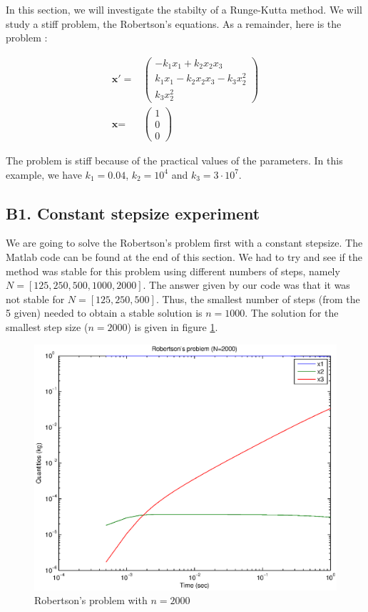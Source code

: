 In this section, we will investigate the stabilty of a Runge-Kutta method. We will study a stiff problem, the Robertson's equations. As a remainder, here is the problem : 

\begin{eqnarray*}
\textbf{x}' =& \left( \begin{array}{c}
-k_1x_1+k_2x_2x_3 \\ 
k_1x_1-k_2x_2x_3-k_3x_2^2 \\ 
k_3x_2^2 
\end{array} \right) \\
\textbf{x} =& \left( \begin{array}{c}
1 \\ 
0 \\ 
0 
\end{array} \right)
\end{eqnarray*}

The problem is stiff because of the practical values of the parameters. In this example, we have $k_1=0.04$, $k_2=10^4$ and $k_3=3 \cdot 10^7$.

\subsection*{B1. Constant stepsize experiment}

We are going to solve the Robertson's problem first with a constant stepsize. The Matlab code can be found at the end of this section. We had to try and see if the method was stable for this problem using different numbers of steps, namely $N = [125, 250, 500, 1000, 2000]$. The answer given by our code was that it was not stable for $N =[125, 250, 500]$. Thus, the smallest number of steps (from the 5 given) needed to obtain a stable solution is $n = 1000$. The solution for the smallest step size ($n = 2000$) is given in figure \ref{robert}.

\begin{figure}
\begin{center}
\includegraphics[scale=0.5]{robert.eps}
\caption{Robertson's problem with $n = 2000$}
\label{robert}
\end{center}
\end{figure}
\FloatBarrier

